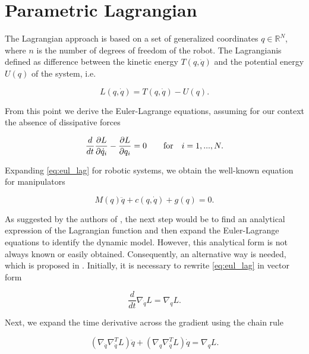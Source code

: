 \documentclass[a4paper]{article}
\begin{document}
\section{Parametric Lagrangian}
\label{sec:parmlag}
The Lagrangian approach is based on a set of generalized coordinates $q\in\mathbb{R}^N$, where $n$ is the number of degrees of freedom of the robot. The Lagrangianis defined as difference between the kinetic energy $T(q,\dot{q})$ and the potential energy $U(q)$ of the system, i.e.

\begin{equation}
    \nonumber
    L(q,\dot{q}) = T(q,\dot{q}) - U(q).
\end{equation}

From this point we derive the Euler-Lagrange equations, assuming for our context the absence of dissipative forces

\begin{equation}
    \label{eq:eul_lag}
    \frac{d}{dt}\frac{\partial L}{\partial \dot{q}_i} - \frac{\partial L}{\partial q_i} = 0\qquad\textnormal{for} \quad i=1,...,N.
\end{equation}

Expanding \eqref{eq:eul_lag} for robotic systems, we obtain the well-known equation for manipulators

\begin{equation}
    \nonumber
    M(q)\ddot{q} + c(q,\dot{q}) + g(q) = 0.
\end{equation}

As suggested by the authors of \cite{lnncranmer}, the next step would be to find an analytical expression of the Lagrangian function and then expand the Euler-Lagrange equations to identify the dynamic model. However, this analytical form is not always known or easily obtained. Consequently, an alternative way is needed, which is proposed in \cite{lnncranmer}. Initially, it is necessary to rewrite \eqref{eq:eul_lag} in vector form  

\begin{equation}
    \nonumber
    \frac{d}{dt}\nabla_{\dot{q}} L = \nabla_{q} L.
\end{equation}

Next, we expand the time derivative across the gradient using the chain rule

\begin{equation}
    \nonumber
    (\nabla_{\dot{q}}\nabla_{\dot{q}}^T L)\ddot{q} + (\nabla_{q}\nabla_{\dot{q}}^T L)\dot{q} = \nabla_{q} L.
\end{equation}
\end{document}
